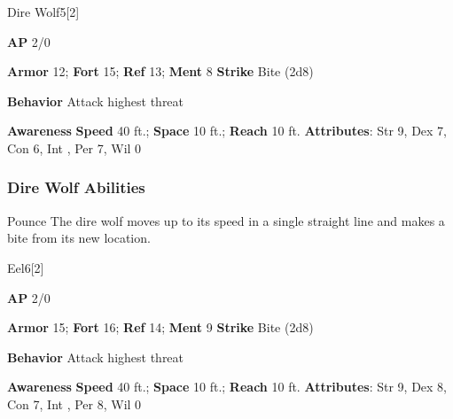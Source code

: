 \begin{monsection}{Dire Wolf}{5}[2]
\vspace{-1em}\vspace{-1em}
\begin{spellcontent}
\begin{spelltargetinginfo}
{\textbf{AP} 2/0}

\pari \textbf{Armor} 12;
\textbf{Fort} 15;
\textbf{Ref} 13;
\textbf{Ment} 8
\pari \textbf{Strike} Bite  (2d8)



\pari \textbf{Behavior} Attack highest threat
\end{spelltargetinginfo}
\end{spellcontent}

\begin{monsterfooter}
\pari \textbf{Awareness} 
\pari \textbf{Speed} 40 ft.;
\textbf{Space} 10 ft.;
\textbf{Reach} 10 ft.
\pari \textbf{Attributes}:
Str 9,
Dex 7,
Con 6,
Int ,
Per 7,
Wil 0
\end{monsterfooter}
\end{monsection}


\subsubsection{Dire Wolf Abilities}

\begin{freeability}{Pounce}
The dire wolf moves up to its speed in a single straight line and makes a bite  from its new location.
\end{freeability}

\begin{monsection}{Eel}{6}[2]
\vspace{-1em}\vspace{-1em}
\begin{spellcontent}
\begin{spelltargetinginfo}
{\textbf{AP} 2/0}

\pari \textbf{Armor} 15;
\textbf{Fort} 16;
\textbf{Ref} 14;
\textbf{Ment} 9
\pari \textbf{Strike} Bite  (2d8)



\pari \textbf{Behavior} Attack highest threat
\end{spelltargetinginfo}
\end{spellcontent}

\begin{monsterfooter}
\pari \textbf{Awareness} 
\pari \textbf{Speed} 40 ft.;
\textbf{Space} 10 ft.;
\textbf{Reach} 10 ft.
\pari \textbf{Attributes}:
Str 9,
Dex 8,
Con 7,
Int ,
Per 8,
Wil 0
\end{monsterfooter}
\end{monsection}

